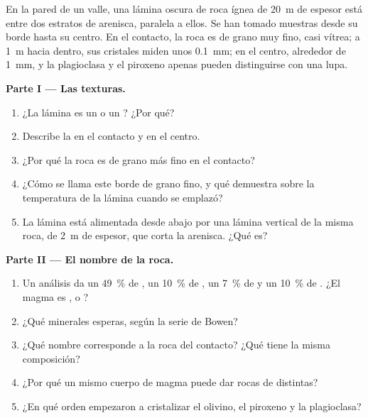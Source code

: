\begin{problem}
\label{pb:g11:igneous-rocks:1}
En la pared de un valle, una lámina oscura de roca ígnea de \qty{20}{m} de
espesor está entre dos estratos de arenisca, paralela a ellos. Se han tomado
muestras desde su borde hasta su centro. En el contacto, la roca es de grano
muy fino, casi vítrea; a \qty{1}{m} hacia dentro, sus cristales miden unos
\qty{0.1}{mm}; en el centro, alrededor de \qty{1}{mm}, y la plagioclasa y el
piroxeno apenas pueden distinguirse con una lupa.

\medskip
\noindent\textbf{Parte I --- Las texturas.}
\begin{enumerate}
  \item ¿La lámina es un  o un ? ¿Por qué?
  \item Describe la  en el contacto y en el centro.
  \item ¿Por qué la roca es de grano más fino en el contacto?
  \item ¿Cómo se llama este borde de grano fino, y qué demuestra sobre la
        temperatura de la lámina cuando se emplazó?
  \item La lámina está alimentada desde abajo por una lámina vertical de la
        misma roca, de \qty{2}{m} de espesor, que corta la arenisca. ¿Qué es?
\end{enumerate}

\medskip
\noindent\textbf{Parte II --- El nombre de la roca.}
\begin{enumerate}[resume]
  \item Un análisis da un \qty{49}{\percent} de , un \qty{10}{\percent}
        de , un \qty{7}{\percent} de  y un \qty{10}{\percent}
        de . ¿El magma es ,  o ?
  \item ¿Qué minerales esperas, según la serie de Bowen?
  \item ¿Qué nombre corresponde a la roca del contacto? ¿Qué 
        tiene la misma composición?
  \item ¿Por qué un mismo cuerpo de magma puede dar rocas de  distintas?
  \item ¿En qué orden empezaron a cristalizar el olivino, el piroxeno y la
        plagioclasa?
\end{enumerate}


\end{problem}
